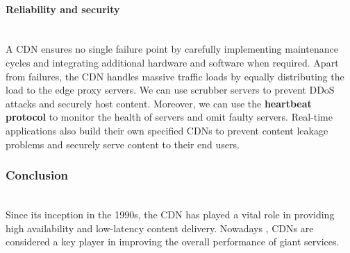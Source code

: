 \paragraph{Reliability and security}\label{Ez43RfkKa4eekncSXytdO}
\\
A CDN ensures no single failure point by carefully implementing maintenance cycles and integrating additional hardware and software when required. Apart from failures, the CDN handles massive traffic loads by equally distributing the load to the edge proxy servers. We can use scrubber servers to prevent DDoS attacks and securely host content. Moreover, we can use the \textbf{heartbeat protocol} to monitor the health of servers and omit faulty servers. Real-time applications also build their own specified CDNs to prevent content leakage problems and securely serve content to their end users.

\subsubsection{Conclusion}\label{yOzLUEumF_Yyqo7LQ2hUb}
\\
Since its inception in the 1990s, the CDN has played a vital role in providing high availability and low-latency content delivery. Nowadays , CDNs are considered a key player in improving the overall performance of giant services.\\
\strut \\

